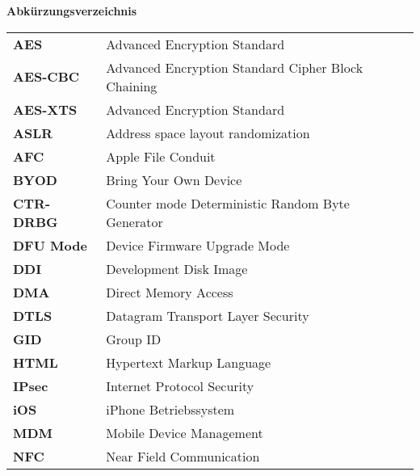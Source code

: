 %
%
% 
% 
% 

\begin{center}
{\Large\bfseries Abkürzungsverzeichnis}
\end{center}

\begin{table*}[htbp]
		\begin{tabular}{ll}
		    \textbf{AES} & Advanced Encryption Standard \\
            \textbf{AES-CBC} & Advanced Encryption Standard Cipher Block Chaining \\
            \textbf{AES-XTS} & Advanced Encryption Standard \\ 
		     \textbf{ASLR} & Address space layout randomization \\
		     \textbf{AFC} & Apple File Conduit\\
		     
		     \textbf{BYOD} & Bring Your Own Device\\
		     
		     \textbf{CTR-DRBG} & Counter mode Deterministic Random Byte Generator \\
		     
		     \textbf{DFU Mode} & Device Firmware Upgrade Mode\\
		     \textbf{DDI} & Development Disk Image \\
		     \textbf{DMA} & Direct Memory Access\\
		     \textbf{DTLS} & Datagram Transport Layer Security \\
		     
		     \textbf{GID} & Group ID \\
		     
		     \textbf{HTML} & Hypertext Markup Language \\
		     
		     \textbf{IPsec} & Internet Protocol Security \\
		     \textbf{iOS} & iPhone Betriebssystem\\
		     
		     
		     \textbf{MDM} & Mobile Device Management \\
		     
		     \textbf{NFC} & Near Field Communication \\
             

\end{tabular}
\end{table*}
